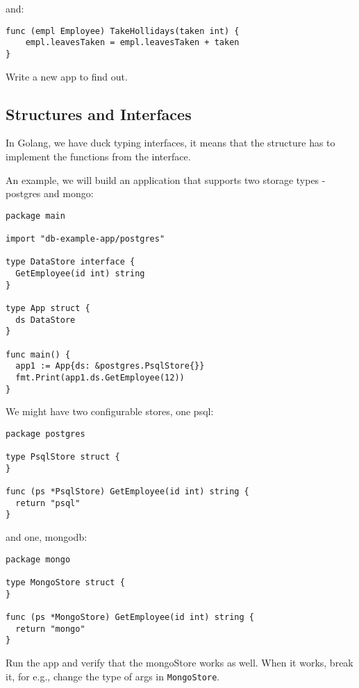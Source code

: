 \documentclass[11pt, letterpaper]{article}
\begin{document}
and:

\begin{verbatim}
func (empl Employee) TakeHollidays(taken int) {
    empl.leavesTaken = empl.leavesTaken + taken
}
\end{verbatim}

Write a new app to find out.

\subsection{Structures and Interfaces}

In Golang, we have duck typing interfaces, it means that the structure has to implement the functions from the interface.

An example, we will build an application that supports two storage types - postgres and mongo:

\begin{verbatim}
package main

import "db-example-app/postgres"

type DataStore interface {
  GetEmployee(id int) string
}

type App struct {
  ds DataStore
}

func main() {
  app1 := App{ds: &postgres.PsqlStore{}}
  fmt.Print(app1.ds.GetEmployee(12))
}
\end{verbatim}

We might have two configurable stores, one psql:

\begin{verbatim}
package postgres

type PsqlStore struct {
}

func (ps *PsqlStore) GetEmployee(id int) string {
  return "psql"
}
\end{verbatim}

and one, mongodb:

\begin{verbatim}
package mongo

type MongoStore struct {
}

func (ps *MongoStore) GetEmployee(id int) string {
  return "mongo"
}
\end{verbatim}

Run the app and verify that the mongoStore works as well. When it works, break it, for e.g., change the type of args in \texttt{MongoStore}.

\end{document}
